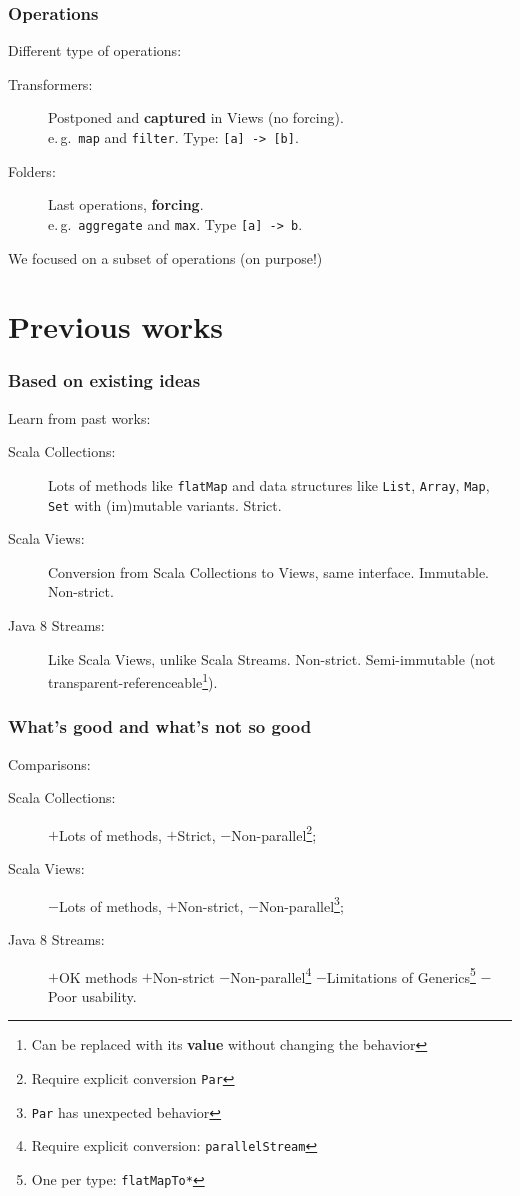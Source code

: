 \documentclass[12pt]{beamer}
\newcommand{\eg}{e.\,g.\ }
\begin{document}
\begin{frame}[fragile]
    \frametitle{Operations}
    Different type of operations:
    \begin{description}
        \item[Transformers:] Postponed and {\bf captured} in Views (no forcing). \\
            \eg \verb|map| and \verb|filter|.
            Type: \verb|[a] -> [b]|.
        \item[Folders:] Last operations, {\bf forcing}. \\
            \eg \verb|aggregate| and \verb|max|.
            Type \verb|[a] -> b|.
    \end{description}

    We focused on a subset of operations (on purpose!)
\end{frame}

\section{Previous works}
\begin{frame}
    \frametitle{Based on existing ideas}
    Learn from past works:
    \begin{description}
        \item[Scala Collections:] Lots of methods like {\tt flatMap} and data structures like {\tt List}, {\tt Array}, {\tt Map}, {\tt Set} with (im)mutable variants.
            Strict.
        \item[Scala Views:] Conversion from Scala Collections to Views, same interface. Immutable.
            Non-strict.
        \item[Java 8 Streams:] Like Scala Views, unlike Scala Streams. Non-strict. Semi-immutable (not transparent-referenceable\footnote{Can be replaced with its {\bf value} without changing the behavior}).
    \end{description}
\end{frame}

\begin{frame}
    \frametitle{What's good and what's not so good}
    Comparisons:
    \begin{description}
        \item[Scala Collections:] $+$Lots of methods, $+$Strict, $-$Non-parallel\footnote{Require explicit conversion {\tt Par}};
        \item[Scala Views:] $-$Lots of methods, $+$Non-strict, $-$Non-parallel\footnote{{\tt Par} has unexpected behavior};
        \item[Java 8 Streams:] $+$OK methods $+$Non-strict $-$Non-parallel\footnote{Require explicit conversion: {\tt parallelStream}} $-$Limitations of Generics\footnote{One per type: {\tt flatMapTo*}} $-$Poor usability.
    \end{description}
\end{frame}
\end{document}
